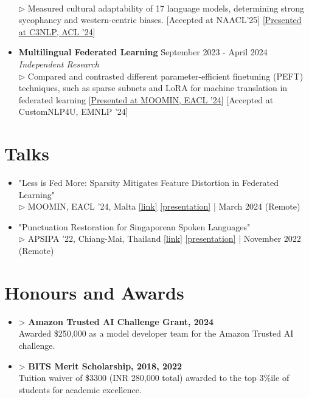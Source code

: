\documentclass[11pt,letterpaper]{article}
\begin{document}
\begin{itemize}[leftmargin=*,label={},itemsep=6pt]
        \\
            $\triangleright$ 
            Measured cultural adaptability of 17 language models, determining strong sycophancy and western-centric biases. [Accepted at NAACL'25] [\href{https://c3nlp.github.io/}{Presented at C3NLP, ACL '24}]
        \\
        \item \textbf{Multilingual Federated Learning} \hfill September 2023 - April 2024\\
            \textit{Independent Research}\\
            $\triangleright$ 
            Compared and contrasted different parameter-efficient finetuning (PEFT) techniques, such as sparse subnets and LoRA for machine translation in federated learning [\href{https://moomin.eacl.org/}{Presented at MOOMIN, EACL '24}] [Accepted at CustomNLP4U, EMNLP '24]
        \\
    \end{itemize}
    
    \section*{Talks}
    \begin{itemize}[leftmargin=*,label={},itemsep=4pt]
        \item "Less is Fed More: Sparsity Mitigates Feature Distortion in Federated Learning" \textit{}\\
            $\triangleright$ 
            MOOMIN, EACL '24, Malta  \href{https://moomin.eacl.org/}{[link]} \href{https://docs.google.com/presentation/d/1DmnfMR08y_vW9TXLn8fpqYJkntlPMDuC/edit?usp=sharing}{[presentation]} | March 2024 (Remote)
        \\
        \item "Punctuation Restoration for Singaporean Spoken Languages" \textit{}\\
            $\triangleright$ 
            APSIPA '22, Chiang-Mai, Thailand  \href{https://www.apsipa.org/conference/2022/}{[link]} \href{https://docs.google.com/presentation/d/1DmnfMR08y_vW9TXLn8fpqYJkntlPMDuC/edit?usp=sharing}{[presentation]} | November 2022 (Remote)
        \\
    \end{itemize}
    
    \section*{Honours and Awards}
    \begin{itemize}[leftmargin=*,label={},itemsep=4pt]
        \item > \textbf{\textit{} Amazon Trusted AI Challenge Grant, 2024}\\
            Awarded \$250,000 as a model developer team for the Amazon Trusted AI challenge.
        \item > \textbf{\textit{} BITS Merit Scholarship, 2018, 2022}\\
            Tuition waiver of \$3300 (INR 280,000 total) awarded to the top 3\%ile of students for academic excellence.
    \end{itemize}
    
\end{document}
